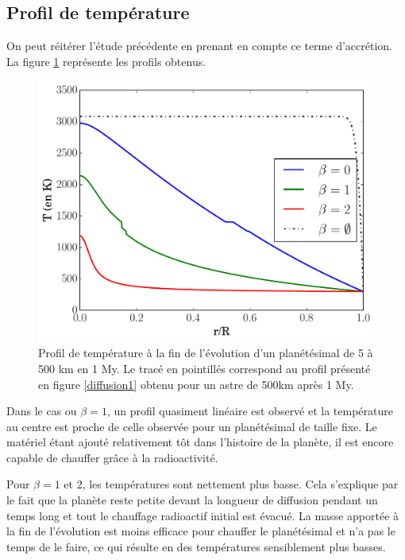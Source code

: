 \documentclass[10pt,a4paper]{article}
\numberwithin{equation}{section}
\begin{document}
\subsection{Profil de température}

On peut réitérer l'étude précédente en prenant en compte ce terme d'accrétion. La figure \ref{profilacre} représente les profils obtenus.

\begin{figure}[h]
    \centering	    
	\includegraphics[scale=0.43]{figures/profil_acre.pdf}
    \caption{Profil de température à la fin de l'évolution d'un planétésimal de 5 à 500 km en 1 My. Le tracé en pointillés correspond au profil présenté en figure \ref{diffusion1} obtenu pour un astre de 500km après 1 My.}
    	\label{profilacre} 
\end{figure}

Dans le cas ou $\beta = 1$, un profil quasiment linéaire est observé et la température au centre est proche de celle observée pour un planétésimal de taille fixe. Le matériel étant ajouté relativement tôt dans l'histoire de la planète, il est encore capable de chauffer grâce à la radioactivité. 
\medskip

Pour $\beta = 1$ et 2, les températures sont nettement plus basse. Cela s'explique par le fait que la planète reste petite devant la longueur de diffusion pendant un temps long et tout le chauffage radioactif initial est évacué. La masse apportée à la fin de l'évolution  est moins efficace pour chauffer le planétésimal et n'a pas le temps de le faire, ce qui résulte en des températures sensiblement plus basses.
\end{document}
